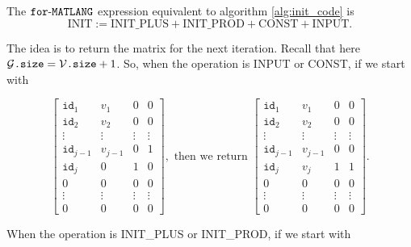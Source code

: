 The $\texttt{for}\text{-}\texttt{MATLANG}$ expression equivalent to algorithm \ref{alg:init_code} is $$\text{INIT}:=\text{INIT{\_}PLUS}+\text{INIT{\_}PROD}+\text{CONST}+\text{INPUT}.$$

The idea is to return the matrix for the next iteration. Recall that here $\mathcal{G}\texttt{.size}=\mathcal{V}\texttt{.size} + 1$. So, when the operation is INPUT or CONST, if we start with

\[
\begin{bmatrix}
    \texttt{id}_1 & v_1 & 0 & 0 \\
    \texttt{id}_2 & v_2 & 0 & 0 \\
    \vdots & \vdots & \vdots & \vdots \\
    \texttt{id}_{j-1} & v_{j-1} & 0 & 1 \\
    \texttt{id}_j & 0 & 1 & 0 \\
    0 & 0 & 0 & 0 \\
    \vdots & \vdots & \vdots & \vdots \\
     0 & 0 & 0 & 0
\end{bmatrix}, \text{ then we return }
\begin{bmatrix}
    \texttt{id}_1 & v_1 & 0 & 0 \\
    \texttt{id}_2 & v_2 & 0 & 0 \\
    \vdots & \vdots & \vdots & \vdots \\
    \texttt{id}_{j-1} & v_{j-1} & 0 & 0 \\
    \texttt{id}_j & v_j & 1 & 1 \\
    0 & 0 & 0 & 0 \\
    \vdots & \vdots & \vdots & \vdots \\
     0 & 0 & 0 & 0
\end{bmatrix}.
\]

When the operation is INIT{\_}PLUS or INIT{\_}PROD, if we start with 


